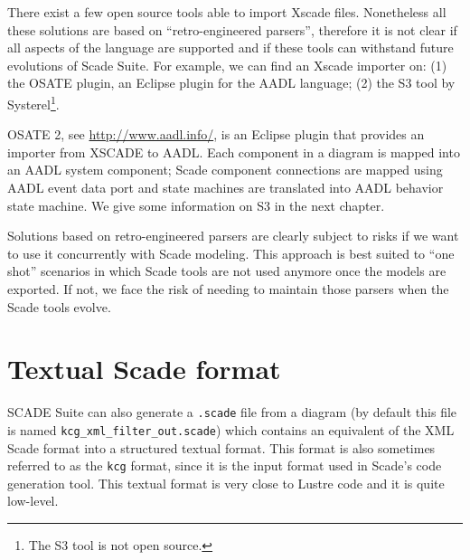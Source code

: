 \documentclass{template/openetcs_report}
\begin{document}
There exist a few open source tools able to import Xscade
files. Nonetheless all these solutions are based on ``retro-engineered
parsers'', therefore it is not clear if all aspects of the language
are supported and if these tools can withstand future evolutions of
Scade Suite. For example, we can find an Xscade importer on: (1) the
OSATE plugin, an Eclipse plugin for the AADL language; (2) the S3 tool
by Systerel\footnote{The S3 tool is not open source.}.

OSATE 2, see \url{http://www.aadl.info/}, is an Eclipse plugin that
provides an importer from XSCADE to AADL. Each component in a diagram
is mapped into an AADL system component; Scade component connections
are mapped using AADL event data port and state machines are
translated into AADL behavior state machine. We give some information
on S3 in the next chapter.

Solutions based on retro-engineered parsers are clearly subject to
risks if we want to use it concurrently with Scade modeling. This
approach is best suited to ``one shot'' scenarios in which Scade tools
are not used anymore once the models are exported. If not, we face the
risk of needing to maintain those parsers when the Scade tools
evolve.


\begin{center}
  \setlength{\fboxsep}{10pt}
\end{center}

\section{Textual Scade format}
\label{sec:textual-scade-format}

SCADE Suite can also generate a \verb+.scade+ file from a diagram (by
default this file is named \verb+kcg_xml_filter_out.scade+) which
contains an equivalent of the XML Scade format into a structured
textual format. This format is also sometimes referred to as the
\verb+kcg+ format, since it is the input format used in Scade's code
generation tool. This textual format is very close to Lustre code and
it is quite low-level.
\end{document}
